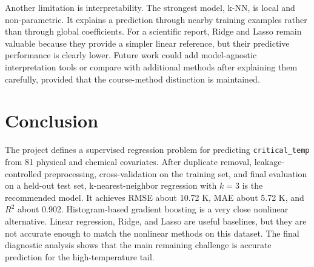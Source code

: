 \documentclass[11pt,a4paper]{article}
\begin{document}
Another limitation is interpretability. The strongest model, k-NN, is local and
non-parametric. It explains a prediction through nearby training examples rather
than through global coefficients. For a scientific report, Ridge and Lasso remain
valuable because they provide a simpler linear reference, but their predictive
performance is clearly lower. Future work could add model-agnostic interpretation
tools or compare with additional methods after explaining them carefully, provided
that the course-method distinction is maintained.

\section{Conclusion}

The project defines a supervised regression problem for predicting
\texttt{critical\_temp} from 81 physical and chemical covariates. After duplicate
removal, leakage-controlled preprocessing, cross-validation on the training set,
and final evaluation on a held-out test set, k-nearest-neighbor regression with
\(k=3\) is the recommended model. It achieves RMSE about 10.72 K, MAE about
5.72 K, and \(R^2\) about 0.902. Histogram-based gradient boosting is a very close
nonlinear alternative. Linear regression, Ridge, and Lasso are useful baselines, but they are not accurate enough to match the
nonlinear methods on this dataset. The final diagnostic analysis shows that the
main remaining challenge is accurate prediction for the high-temperature tail.
\end{document}
